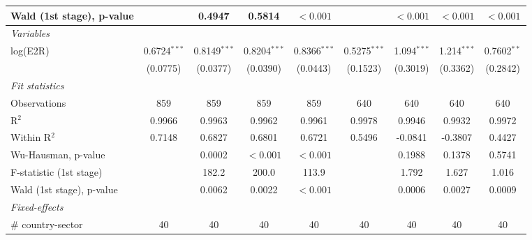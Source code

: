 \documentclass[a4paper]{article}
\begin{document}
\begin{table}[h!]
{\begin{tabular}{lcccccccc}
      Wald (1st stage), p-value &                   & 0.4947                & 0.5814                 & $<0.001$  &                    & $<0.001$  & $<0.001$   & $<0.001$\\
      \midrule
       \emph{Variables}\\
      log(E2R)                & 0.6724$^{***}$     & 0.8149$^{***}$         & 0.8204$^{***}$         & 0.8366$^{***}$         & 0.5275$^{***}$     & 1.094$^{***}$         & 1.214$^{***}$          & 0.7602$^{**}$\\   
                              & (0.0775)           & (0.0377)               & (0.0390)               & (0.0443)               & (0.1523)           & (0.3019)              & (0.3362)               & (0.2842)\\ 
      \emph{Fit statistics}\\
      Observations            & 859                & 859                    & 859                    & 859                    & 640                & 640                   & 640                    & 640\\  
      R$^2$                   & 0.9966             & 0.9963                 & 0.9962                 & 0.9961                 & 0.9978             & 0.9946                & 0.9932                 & 0.9972\\  
      Within R$^2$            & 0.7148             & 0.6827                 & 0.6801                 & 0.6721                 & 0.5496             & -0.0841               & -0.3807                & 0.4427\\  
      Wu-Hausman, p-value     &                    & 0.0002                 & $<0.001$               & $<0.001$               &                    & 0.1988                & 0.1378                 & 0.5741\\  
      F-statistic (1st stage)        &                    & 182.2                 & 200.0                  & 113.9                  &                    & 1.792                 & 1.627                  & 1.016\\  
      Wald (1st stage), p-value &                    & 0.0062                & 0.0022                 & $<0.001$  &                    & 0.0006                & 0.0027                 & 0.0009\\ 
      \midrule
      \emph{Fixed-effects}\\
      \# country-sector       & 40                 & 40                    & 40                     & 40                    & 40                 & 40                    & 40                     & 40\\  

\end{tabular}}
\end{table}
\end{document}
